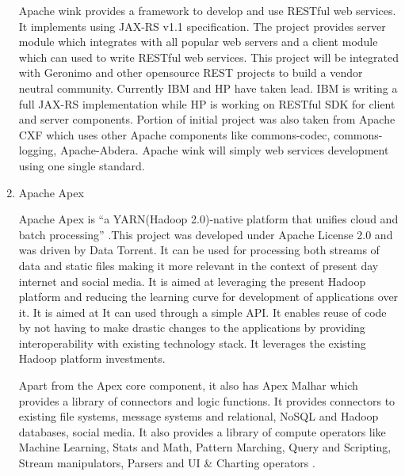 \begin{enumerate}
Apache wink \label{\detokenize{i524/technologies:id721}}{\hyperref[\detokenize{i524/technologies:www-apache-wink}]{\sphinxcrossref{{[}629{]}}}} provides a framework to
develop and use RESTful web services. It implements using JAX-RS
v1.1 specification. The project provides server module which
integrates with all popular web servers and a client module which
can used to write RESTful web services. This project will be
integrated with Geronimo and other opensource REST projects to
build a vendor neutral community. Currently IBM and HP have taken
lead. IBM is writing a full JAX-RS implementation while HP is
working on RESTful SDK for client and server components.  Portion
of initial project was also taken from Apache CXF which uses
other Apache components like commons-codec, commons-logging,
Apache-Abdera. Apache wink will simply web services development
using one single standard.

\item {} 
Apache Apex

Apache Apex is “a YARN(Hadoop 2.0)-native platform that unifies
cloud and batch processing” \label{\detokenize{i524/technologies:id722}}{\hyperref[\detokenize{i524/technologies:www-apacheapexwiki}]{\sphinxcrossref{{[}630{]}}}}.This
project was developed under Apache License 2.0 and was driven by
Data Torrent. It can be used for processing both streams of data
and static files making it more relevant in the context of
present day internet and social media. It is aimed at leveraging
the present Hadoop platform and reducing the learning curve for
development of applications over it. It is aimed at It can used
through a simple API. It enables reuse of code by not having to
make drastic changes to the applications by providing
interoperability with existing technology stack. It leverages the
existing Hadoop platform investments.

Apart from the Apex core component, it also has Apex Malhar which
provides a library of connectors and logic functions. It provides
connectors to existing file systems, message systems and relational,
NoSQL and Hadoop databases, social media. It also provides a library
of compute operators like Machine Learning, Stats and Math, Pattern
Marching, Query and Scripting, Stream manipulators, Parsers and UI \&
Charting operators \label{\detokenize{i524/technologies:id723}}{\hyperref[\detokenize{i524/technologies:www-apacheapexblog}]{\sphinxcrossref{{[}631{]}}}}.

\end{enumerate}


